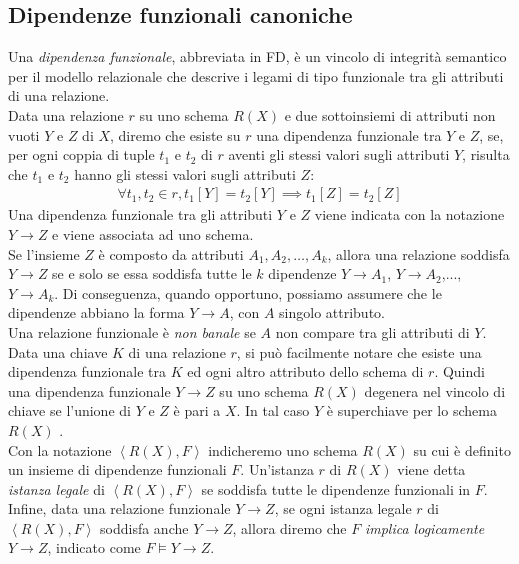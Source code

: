 \subsection{Dipendenze funzionali canoniche}
Una \textit{dipendenza funzionale}, abbreviata in FD, è un vincolo di integrità semantico per il modello relazionale che descrive i legami di tipo funzionale tra gli attributi di una relazione. \\
Data una relazione $r$ su uno schema $R(X)$ e due sottoinsiemi di attributi non vuoti $Y$ e $Z$ di $X$, diremo che esiste su $r$ una dipendenza funzionale tra $Y$ e $Z$, se, per ogni coppia di tuple $t_1$ e $t_2$ di $r$ aventi gli stessi valori sugli attributi $Y$, risulta che $t_1$ e $t_2$ hanno gli stessi valori sugli attributi $Z$:
\begin{eqnarray}
\forall t_1, t_2 \in r, t_1[Y] = t_2[Y] \implies t_1[Z] = t_2[Z]
\end{eqnarray}
Una dipendenza funzionale tra gli attributi $Y$ e $Z$ viene indicata con la notazione $Y \rightarrow Z$ e viene associata ad uno schema.\\
Se l'insieme $Z$ è composto da attributi $A_1, A_2, \ldots, A_k$, allora una relazione soddisfa $Y \rightarrow Z$ se e solo se essa soddisfa tutte le $k$ dipendenze $Y \rightarrow A_1$, $Y \rightarrow A_2$,..., $Y \rightarrow A_k$. Di conseguenza, quando opportuno, possiamo assumere che le dipendenze abbiano la forma $Y \rightarrow A$, con $A$ singolo attributo. \\
Una relazione funzionale è \textit{non banale} se $A$ non compare tra gli attributi di $Y$. \\
Data una chiave $K$ di una relazione $r$, si può facilmente notare che esiste una dipendenza funzionale tra $K$ ed ogni altro attributo dello schema di $r$. Quindi una dipendenza funzionale $Y \rightarrow Z$ su uno schema $R(X)$ degenera nel vincolo di chiave se l'unione di $Y$ e $Z$ è pari a $X$. In tal caso $Y$ è superchiave per lo schema $R(X)$ . \\
Con la notazione $\left\langle R(X), F \right\rangle$ indicheremo uno schema $R(X)$ su cui è definito un insieme di dipendenze funzionali $F$. Un'istanza $r$ di $R(X)$ viene detta \textit{istanza legale} di  $\left\langle R(X), F \right\rangle$ se soddisfa tutte le dipendenze funzionali in $F$. Infine, data una relazione funzionale $Y \rightarrow Z$, se ogni istanza legale $r$ di $\left\langle R(X), F \right\rangle$ soddisfa anche $Y \rightarrow Z$, allora diremo che $F$ \textit{implica logicamente} $Y \rightarrow Z$, indicato come $F \models Y \rightarrow Z$.\\

